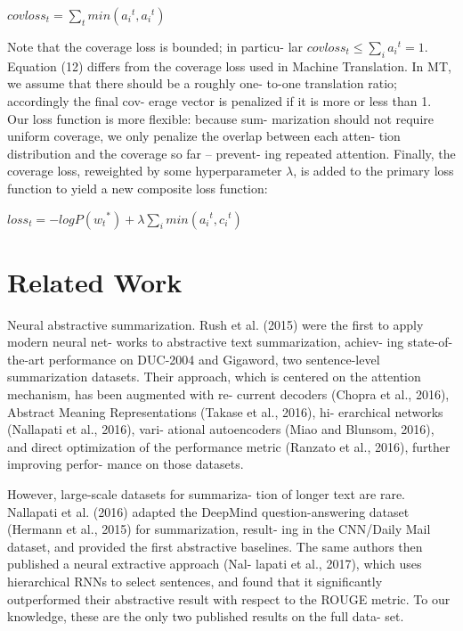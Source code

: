 \documentclass[UTF8]{ctexart}
\begin{document}
$ covloss_t=\sum_{t}min({a_i}^t,{a_i}^t)                                         $

Note that the coverage loss is bounded; in particu-
lar $covloss_t ≤ \sum_{i} {a_i}^t=1$. Equation (12) differs from
the coverage loss used in Machine Translation. In
MT, we assume that there should be a roughly one-
to-one translation ratio; accordingly the final cov-
erage vector is penalized if it is more or less than 1.
Our loss function is more flexible: because sum-
marization should not require uniform coverage,
we only penalize the overlap between each atten-
tion distribution and the coverage so far – prevent-
ing repeated attention. Finally, the coverage loss,
reweighted by some hyperparameter $\lambda$, is added to
the primary loss function to yield a new composite
loss function:

$  loss_t=-logP({w_t}^*)+\lambda \sum_{i}min({a_i}^t,{c_i}^t)                             $



   \section{Related Work}

   Neural abstractive summarization. Rush et al.
(2015) were the first to apply modern neural net-
works to abstractive text summarization, achiev-
ing state-of-the-art performance on DUC-2004
and Gigaword, two sentence-level summarization
datasets. Their approach, which is centered on the
attention mechanism, has been augmented with re-
current decoders (Chopra et al., 2016), Abstract
Meaning Representations (Takase et al., 2016), hi-
erarchical networks (Nallapati et al., 2016), vari-
ational autoencoders (Miao and Blunsom, 2016),
and direct optimization of the performance metric
(Ranzato et al., 2016), further improving perfor-
mance on those datasets.


However, large-scale datasets for summariza-
tion of longer text are rare. Nallapati et al. (2016)
adapted the DeepMind question-answering dataset
(Hermann et al., 2015) for summarization, result-
ing in the CNN/Daily Mail dataset, and provided
the first abstractive baselines. The same authors
then published a neural extractive approach (Nal-
lapati et al., 2017), which uses hierarchical RNNs
to select sentences, and found that it significantly
outperformed their abstractive result with respect
to the ROUGE metric. To our knowledge, these
are the only two published results on the full data-
set.
\end{document}
